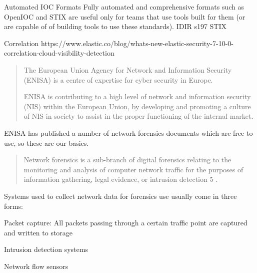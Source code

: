 \documentclass[Screen16to9,17pt]{foils}
\begin{document}
\begin{list2}
  \item
\end{list2}
Automated IOC Formats
Fully automated and comprehensive formats such as OpenIOC and STIX are useful
only for teams that use tools built for them (or are capable of of building tools to use
these standards).
IDIR s197 STIX




\slide{}


\begin{quote}

\end{quote}

\begin{list2}
  \item
\end{list2}
Correlation
https://www.elastic.co/blog/whats-new-elastic-security-7-10-0-correlation-cloud-visibility-detection







\begin{quote}
  The European Union Agency for Network and Information Security (ENISA) is a centre of expertise for cyber security in Europe.

ENISA is contributing to a high level of network and information security (NIS) within the European Union, by developing and promoting a culture of NIS in society to assist in the proper functioning of the internal market.
\end{quote}


ENISA has published a number of network forensics documents which are free to use, so these are our basics.



\begin{quote}
Network forensics is a sub-branch of digital forensics relating to the monitoring and analysis of computer
network traffic for the purposes of information gathering, legal evidence, or intrusion detection 5 .
\end{quote}

\begin{list1}
\item Systems used to collect network data for forensics use usually come in three forms:
\begin{list2}
\item Packet capture: All packets passing through a certain traffic point are captured and written to storage
\item Intrusion detection systems
\item Network flow sensors
\end{list2}
\end{list1}
\end{document}
